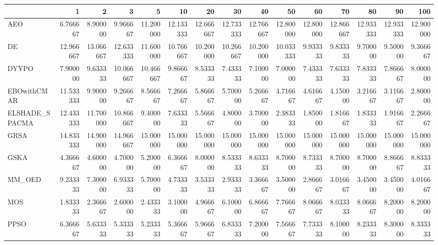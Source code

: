 \begin{tabular}{lrrrrrrrrrrrrrr}
\toprule
{} &        1   &        2   &        3   &        5   &        10  &        20  &        30  &        40  &        50  &        60  &        70  &        80  &        90  &        100 \\
\midrule
AEO            &   6.766667 &   8.900000 &   9.966667 &  11.200000 &  12.133333 &  12.666667 &  12.733333 &  12.766667 &  12.800000 &  12.800000 &  12.866667 &  12.933333 &  12.933333 &  12.900000 \\
DE             &  12.966667 &  13.066667 &  12.633333 &  11.600000 &  10.766667 &  10.200000 &  10.266667 &  10.200000 &  10.033333 &   9.933333 &   9.833333 &   9.700000 &   9.500000 &   9.366667 \\
DYYPO          &   7.900000 &   9.633333 &  10.066667 &  10.466667 &   9.866667 &   8.533333 &   7.433333 &   7.100000 &   7.000000 &   7.433333 &   7.633333 &   7.833333 &   7.866667 &   8.000000 \\
EBOwithCMAR    &  11.533333 &   9.900000 &   9.266667 &   8.566667 &   7.266667 &   5.866667 &   5.700000 &   5.266667 &   4.716667 &   4.616667 &   4.150000 &   3.216667 &   3.116667 &   2.800000 \\
ELSHADE\_SPACMA &  12.433333 &  11.700000 &  10.866667 &   9.400000 &   7.633333 &   5.566667 &   4.800000 &   3.700000 &   2.383333 &   1.850000 &   1.816667 &   1.833333 &   1.916667 &   2.266667 \\
GRSA           &  14.833333 &  14.900000 &  14.966667 &  15.000000 &  15.000000 &  15.000000 &  15.000000 &  15.000000 &  15.000000 &  15.000000 &  15.000000 &  15.000000 &  15.000000 &  15.000000 \\
GSKA           &   4.366667 &   4.600000 &   4.700000 &   5.200000 &   6.366667 &   8.000000 &   8.533333 &   8.633333 &   8.700000 &   8.733333 &   8.700000 &   8.700000 &   8.866667 &   8.833333 \\
MM\_OED         &   9.233333 &   7.300000 &   6.933333 &   5.700000 &   4.733333 &   3.533333 &   2.933333 &   3.366667 &   3.500000 &   2.866667 &   3.016667 &   3.450000 &   3.450000 &   4.016667 \\
MOS            &   1.833333 &   2.366667 &   2.600000 &   2.433333 &   3.100000 &   4.966667 &   6.100000 &   6.866667 &   7.766667 &   8.066667 &   8.033333 &   8.066667 &   8.200000 &   8.200000 \\
PPSO           &   6.366667 &   5.633333 &   5.333333 &   5.233333 &   5.366667 &   5.966667 &   6.833333 &   7.200000 &   7.566667 &   7.733333 &   8.100000 &   8.233333 &   8.300000 &   8.333333 \\

\end{tabular}
